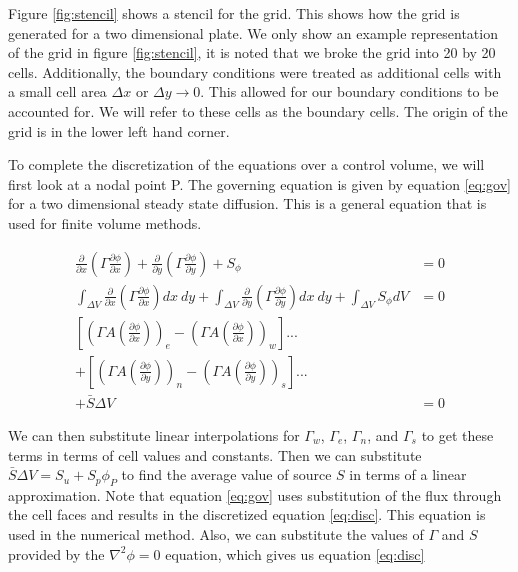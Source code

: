 \documentclass[cleanfoot,cleanhead,twocolumn,10pt,notitlepage]{asme2e}
\begin{document}
Figure \ref{fig:stencil} shows a stencil for the grid.  This shows how the grid is generated for a two dimensional plate.  We only show an example representation of the grid in figure \ref{fig:stencil}, it is noted that we broke the grid into 20 by 20 cells.  Additionally, the boundary conditions were treated as additional cells with a small cell area $\Delta x$ or $\Delta y \rightarrow 0$.  This allowed for our boundary conditions to be accounted for.  We will refer to these cells as the boundary cells.  The origin of the grid is in the lower left hand corner.

To complete the discretization of the equations over a control volume, we will first look at a nodal point P.  The governing equation is given by equation \ref{eq:gov} for a two dimensional steady state diffusion.  This is a general equation that is used for finite volume methods.



\begin{equation}
\begin{aligned}
\frac{\partial}{\partial x} \left( \Gamma \frac{\partial \phi}{\partial x} \right) 
+ \frac{\partial}{\partial y} \left( \Gamma \frac{\partial \phi}{\partial y} \right) 
+ S_\phi
&= 0 \\
\int_{\Delta V} \frac{\partial}{\partial x} \left( \Gamma \frac{\partial \phi}{\partial x} \right) dx~dy
+ \int_{\Delta V} \frac{\partial}{\partial y} \left( \Gamma \frac{\partial \phi}{\partial y} \right) dx~dy
+ \int_{\Delta V} S_{\phi} dV 
&= 0\\
\left[
\left( \Gamma A \left( \frac{\partial \phi}{\partial x} \right) \right)_e
- \left( \Gamma A \left( \frac{\partial \phi}{\partial x} \right) \right)_w
\right]
...\\+
\left[
\left( \Gamma A \left( \frac{\partial \phi}{\partial y} \right) \right)_n
- \left( \Gamma A \left( \frac{\partial \phi}{\partial y} \right) \right)_s
\right]
...\\+ 
\bar{S} \Delta V &= 0
\label{eq:gov}
\end{aligned}
\end{equation}

We can then substitute linear interpolations for $\Gamma_w$, $\Gamma_e$, $\Gamma_n$, and $\Gamma_s$ to get these terms in terms of cell values and constants.  Then we can substitute $\bar{S}\Delta V = S_u + S_p\phi_P$ to find the average value of source $S$ in terms of a linear approximation.  Note that equation \ref{eq:gov} uses substitution of the flux through the cell faces and results in the discretized equation \ref{eq:disc}.  This equation is used in the numerical method.  Also, we can substitute the values of $\Gamma$ and $S$ provided by the $\nabla^2 \phi = 0$ equation, which gives us equation \ref{eq:disc}
\end{document}
